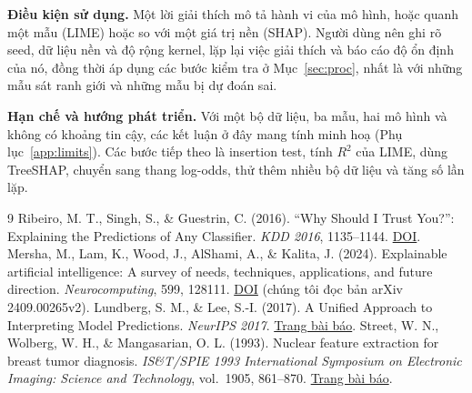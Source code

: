 \documentclass[11pt,a4paper]{article}
\begin{document}
\textbf{Điều kiện sử dụng.} Một lời giải thích mô tả hành vi của mô hình,
hoặc quanh một mẫu (LIME) hoặc so với một giá trị nền (SHAP). Người dùng nên
ghi rõ seed, dữ liệu nền và độ rộng kernel, lặp lại việc giải thích và báo
cáo độ ổn định của nó, đồng thời áp dụng các bước kiểm tra ở
Mục~\ref{sec:proc}, nhất là với những mẫu sát ranh giới và những mẫu bị dự
đoán sai.

\textbf{Hạn chế và hướng phát triển.} Với một bộ dữ liệu, ba mẫu, hai mô hình
và không có khoảng tin cậy, các kết luận ở đây mang tính minh hoạ
(Phụ lục~\ref{app:limits}). Các bước tiếp theo là insertion test, tính $R^2$
của LIME, dùng TreeSHAP, chuyển sang thang log-odds, thử thêm nhiều bộ dữ
liệu và tăng số lần lặp.

\begin{thebibliography}{9}
 Ribeiro, M. T., Singh, S., \& Guestrin, C. (2016). ``Why Should I Trust You?'': Explaining the Predictions of Any Classifier. \emph{KDD 2016}, 1135--1144. \href{https://doi.org/10.1145/2939672.2939778}{DOI}.
 Mersha, M., Lam, K., Wood, J., AlShami, A., \& Kalita, J. (2024). Explainable artificial intelligence: A survey of needs, techniques, applications, and future direction. \emph{Neurocomputing}, 599, 128111. \href{https://doi.org/10.1016/j.neucom.2024.128111}{DOI} (chúng tôi đọc bản arXiv 2409.00265v2).
 Lundberg, S. M., \& Lee, S.-I. (2017). A Unified Approach to Interpreting Model Predictions. \emph{NeurIPS 2017}. \href{https://proceedings.neurips.cc/paper_files/paper/2017/hash/8a20a8621978632d76c43dfd28b67767-Abstract.html}{Trang bài báo}.
 Street, W. N., Wolberg, W. H., \& Mangasarian, O. L. (1993). Nuclear feature extraction for breast tumor diagnosis. \emph{IS\&T/SPIE 1993 International Symposium on Electronic Imaging: Science and Technology}, vol.\ 1905, 861--870. \href{https://api.semanticscholar.org/CorpusID:14922543}{Trang bài báo}.
\end{thebibliography}
\end{document}
